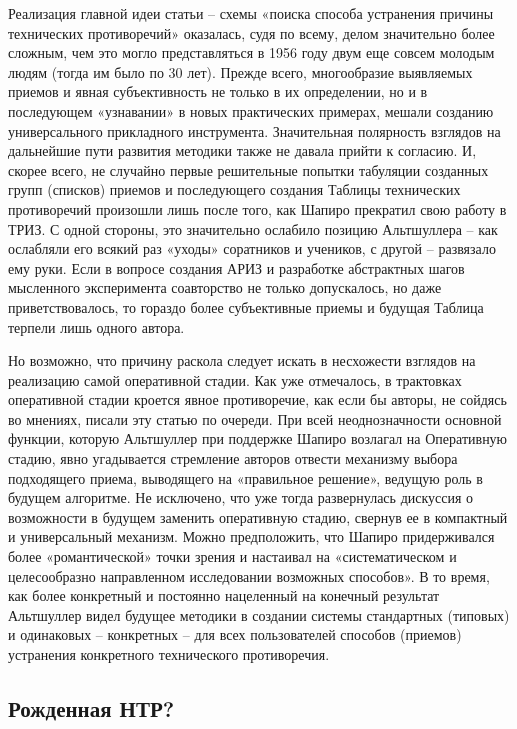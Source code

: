 \documentclass[11pt,a4paper]{article}
\begin{document}
Реализация главной идеи статьи -- схемы «поиска способа устранения причины
технических противоречий» оказалась, судя по всему, делом значительно более
сложным, чем это могло представляться в 1956 году двум еще совсем молодым
людям (тогда им было по 30 лет). Прежде всего, многообразие выявляемых приемов
и явная субъективность не только в их определении, но и в последующем
«узнавании» в новых практических примерах, мешали созданию универсального
прикладного инструмента. Значительная полярность взглядов на дальнейшие пути
развития методики также не давала прийти к согласию. И, скорее всего, не
случайно первые решительные попытки табуляции созданных групп (списков)
приемов и последующего создания Таблицы технических противоречий произошли
лишь после того, как Шапиро прекратил свою работу в ТРИЗ. С одной стороны, это
значительно ослабило позицию Альтшуллера -- как ослабляли его всякий раз
«уходы» соратников и учеников, с другой -- развязало ему руки. Если в вопросе
создания АРИЗ и разработке абстрактных шагов мысленного эксперимента
соавторство не только допускалось, но даже приветствовалось, то гораздо более
субъективные приемы и будущая Таблица терпели лишь одного автора.

Но возможно, что причину раскола следует искать в несхожести взглядов на
реализацию самой оперативной стадии. Как уже отмечалось, в трактовках
оперативной стадии кроется явное противоречие, как если бы авторы, не сойдясь
во мнениях, писали эту статью по очереди. При всей неоднозначности основной
функции, которую Альтшуллер при поддержке Шапиро возлагал на Оперативную
стадию, явно угадывается стремление авторов отвести механизму выбора
подходящего приема, выводящего на «правильное решение», ведущую роль в будущем
алгоритме. Не исключено, что уже тогда развернулась дискуссия о возможности в
будущем заменить оперативную стадию, свернув ее в компактный и универсальный
механизм. Можно предположить, что Шапиро придерживался более «романтической»
точки зрения и настаивал на «систематическом и целесообразно направленном
исследовании возможных способов». В то время, как более конкретный и постоянно
нацеленный на конечный результат Альтшуллер видел будущее методики в создании
системы стандартных (типовых) и одинаковых -- конкретных -- для всех
пользователей способов (приемов) устранения конкретного технического
противоречия.

\subsection*{Рожденная НТР?}
\end{document}
